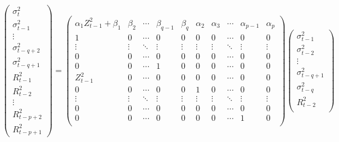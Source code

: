 \begin{tiny}
  \begin{equation}
    \label{eq:jopger}
    \begin{pmatrix}
      \sigma_{t}^2 \\
      \sigma_{t-1}^2 \\
      \vdots \\
      \sigma_{t-q+2}^2 \\
      \sigma_{t-q+1}^2 \\
      R_{t-1}^2 \\
      R_{t-2}^2 \\
      \vdots \\
      R_{t-p+2}^2 \\
      R_{t-p+1}^2
    \end{pmatrix}
    =
    \begin{pmatrix}
      \alpha_1 Z_{t-1}^2 + \beta_1 & \beta_2 & \cdots &
      \beta_{q-1} & \beta_q & \alpha_2 & \alpha_3 &
      \cdots & \alpha_{p-1} & \alpha_p\\
      1 & 0 & \cdots & 
      0 & 0 & 0 & 0 & \cdots & 0 & 0 \\
      \vdots & \vdots & \ddots & 
      \vdots & \vdots & \vdots & \vdots &
      \ddots & \vdots & \vdots \\
      0 & 0 & \cdots &
      0 & 0 & 0 & 0 & \cdots & 0 & 0 \\
      0 & 0 & \cdots &
      1 & 0 & 0 & 0 & \cdots & 0 & 0 \\
      Z_{t-1}^2 & 0 & \cdots &
      0 & 0 & 0 & 0 & \cdots & 0 & 0 \\
      0 & 0 & \cdots &
      0 & 0 & 1 & 0 & \cdots & 0 & 0 \\
      \vdots & \vdots & \ddots &
      \vdots & \vdots & \vdots & \vdots &
      \ddots & \vdots & \vdots \\
      0 & 0 & \cdots &
      0 & 0 & 0 & 0 & \cdots & 0 & 0 \\    
      0 & 0 & \cdots &
      0 & 0 & 0 & 0 & \cdots & 1 & 0 \\    
    \end{pmatrix}
    \begin{pmatrix}
      \sigma_{t-1}^2 \\
      \sigma_{t-2}^2 \\
      \vdots \\
      \sigma_{t-q+1}^2 \\
      \sigma_{t-q}^2 \\
      R_{t-2}^2 \\

\end{pmatrix}
\end{equation}
\end{tiny}
